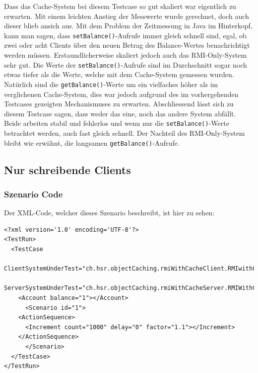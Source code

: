 Dass das Cache-System bei diesem Testcase so gut ska\-liert war eigentlich zu erwarten. Mit einem leichten An\-s\-tieg der Mess\-werte wurde gerechnet, doch auch dieser blieb ansich aus. Mit dem Pro\-blem der Zeit\-messung in Java im Hinter\-kopf, kann man sagen, dass \texttt{setBalance()}-Aufrufe immer gleich schnell sind, egal, ob zwei oder acht Clients über den neuen Betrag des Balance-Wertes benachrichtigt werden müssen.\newline
Erstaundlicherweise skaliert jedoch auch das RMI-Only-System sehr gut. Die Werte der \texttt{setBalance()}-Aufrufe sind im Durch\-schnitt sogar noch etwas tiefer als die Werte, welche mit dem Cache-System gemessen wurden. Natürlich sind die \texttt{getBalance()}-Werte um ein vielfaches höher als im verglichenen Cache-System, dies war jedoch aufgrund des im vorhergehenden Testcases gezeigten Mechanismuses zu erwarten.\newline
Abschliessend lässt sich zu diesem Testcase sagen, dass weder das eine, noch das andere System abfällt. Beide arbeiten stabil und fehlerlos und wenn nur die \texttt{setBalance()}-Werte betrachtet werden, auch fast gleich schnell. Der Nachteil des RMI-Only-System bleibt wie erwähnt, die langsamen \texttt{getBalance()}-Aufrufe.

\subsection{Nur schreibende Clients}
\subsubsection{Szenario Code}
Der XML-Code, welcher dieses Szenario beschreibt, ist hier zu sehen:
\begin{lstlisting}
<?xml version='1.0' encoding='UTF-8'?>
<TestRun>
  <TestCase
    ClientSystemUnderTest="ch.hsr.objectCaching.rmiWithCacheClient.RMIwithCacheClientSystem"
    ServerSystemUnderTest="ch.hsr.objectCaching.rmiWithCacheServer.RMIWithCacheServerSystem">
    <Account balance="1"></Account>
      <Scenario id="1">
	<ActionSequence>
	  <Increment count="1000" delay="0" factor="1.1"></Increment>
	</ActionSequence>
      </Scenario>
  </TestCase>
</TestRun>
\end{lstlisting}
